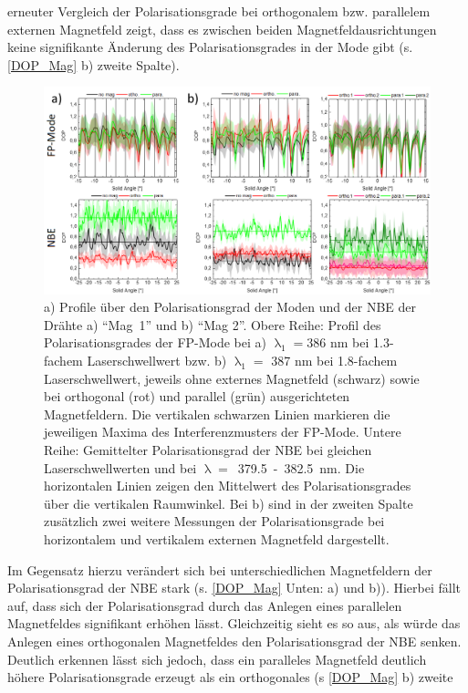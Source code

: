 erneuter Vergleich der Polarisationsgrade bei orthogonalem bzw. parallelem
externen Magnetfeld zeigt, dass es zwischen beiden Magnetfeldausrichtungen keine
signifikante Änderung des Polarisationsgrades in der Mode gibt (s.
\autoref{DOP_Mag} b) zweite Spalte).\\\begin{figure}[b] \centering
\includegraphics[width=1\textwidth]{Bilder/Mag/DOP_Mag} \caption{a) Profile über
den Polarisationsgrad der Moden und der NBE der Drähte a) \mbox{``Mag 1''} und
b) ``Mag 2''. Obere Reihe: Profil des Polarisationsgrades der FP-Mode bei a)
$\uplambda_\text{1}=$386 nm bei 1.3-fachem Laserschwellwert bzw. b)
$\uplambda_\text{1}=$ 387 nm bei 1.8-fachem Laserschwellwert, jeweils ohne
externes Magnetfeld (schwarz) sowie bei orthogonal (rot) und parallel (grün)
ausgerichteten Magnetfeldern. Die vertikalen schwarzen Linien markieren die
jeweiligen Maxima des Interferenzmusters der FP-Mode. Untere Reihe: Gemittelter
Polarisationsgrad der NBE bei gleichen Laserschwellwerten und bei
\mbox{$\uplambda=$ 379.5 - 382.5 nm}. Die horizontalen Linien zeigen den
Mittelwert des Polarisationsgrades über die vertikalen Raumwinkel. Bei b) sind
in der zweiten Spalte zusätzlich zwei weitere Messungen der Polarisationsgrade
bei horizontalem und vertikalem externen Magnetfeld dargestellt.}
\label{DOP_Mag} \end{figure} Im Gegensatz hierzu verändert sich bei
unterschiedlichen Magnetfeldern der Polarisationsgrad der NBE stark (s.
\autoref{DOP_Mag} Unten: a) und b)). Hierbei fällt auf, dass sich der
Polarisationsgrad durch das Anlegen eines parallelen Magnetfeldes signifikant
erhöhen lässt. Gleichzeitig sieht es so aus, als würde das Anlegen eines
orthogonalen Magnetfeldes den Polarisationsgrad der NBE senken. Deutlich
erkennen lässt sich jedoch, dass ein paralleles Magnetfeld deutlich höhere
Polarisationsgrade erzeugt als ein orthogonales (s \autoref{DOP_Mag} b) zweite
